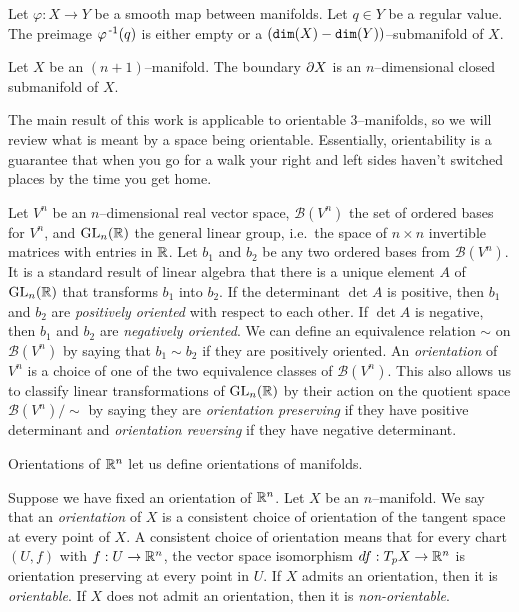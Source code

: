 \begin{theorem}
	Let $\varphi:X\to Y$ be a smooth map between manifolds.
	Let $q\in Y$ be a regular value.
	The preimage $\varphi^{\,\text{-}1}(q)$ is either empty or a $(\texttt{dim}(X)-\texttt{dim}(Y))$--submanifold of $X$.
\end{theorem}

\begin{prop}
	\label{prop:boundariesaremanifolds}
	Let $X$ be an $(n+1)$--manifold.
	The boundary $\partial X$ is an $n$--dimensional closed submanifold of $X$.
\end{prop}

The main result of this work is applicable to orientable 3--manifolds, so we will review what is meant by a space being orientable.
Essentially, orientability is a guarantee that when you go for a walk your right and left sides haven't switched places by the time you get home.

\begin{defn}
	\label{def:orientation}
	Let $V^n$ be an $n$--dimensional real vector space, $\mathcal{B}(V^n)$ the set of ordered bases for $V^n$, and $\textrm{GL}_{n}(\mathbb{R})$ the general linear group, i.e.\ the space of $n\times n$ invertible matrices with entries in $\mathbb{R}$.
	Let $b_1$ and $b_2$ be any two ordered bases from $\mathcal{B}(V^n)$.
	It is a standard result of linear algebra that there is a unique element $A$ of $\textrm{GL}_{n}(\mathbb{R})$ that transforms $b_1$ into $b_2$.
	If the determinant $\det A$ is positive, then $b_1$ and $b_2$ are \emph{positively oriented} with respect to each other.
	If $\det A$ is negative, then $b_1$ and $b_2$ are \emph{negatively oriented}.
	We can define an equivalence relation $\sim$ on $\mathcal{B}(V^n)$ by saying that $b_1\sim b_2$ if they are positively oriented.
	An \emph{orientation} of $V^n$ is a choice of one of the two equivalence classes of $\mathcal{B}(V^n)$.
	This also allows us to classify linear transformations of $\textrm{GL}_{n}(\mathbb{R})$ by their action on the quotient space $\mathcal{B}(V^n)/\sim$ by saying they are \emph{orientation preserving} if they have positive determinant and \emph{orientation reversing} if they have negative determinant.
\end{defn}

Orientations of $\mathbb{R}^n$ let us define orientations of manifolds.

\begin{defn}
	Suppose we have fixed an orientation of $\mathbb{R}^n$.
	Let $X$ be an $n$--manifold.
	We say that an \emph{orientation} of $X$ is a consistent choice of orientation of the tangent space at every point of $X$.
	A consistent choice of orientation means that for every chart $(U,f)$ with $f:U\to\mathbb{R}^n$, the vector space isomorphism $df:T_p X\to \mathbb{R}^n$ is orientation preserving at every point in $U$. 
	If $X$ admits an orientation, then it is \emph{orientable}.
	If $X$ does not admit an orientation, then it is \emph{non-orientable}.	
\end{defn}

